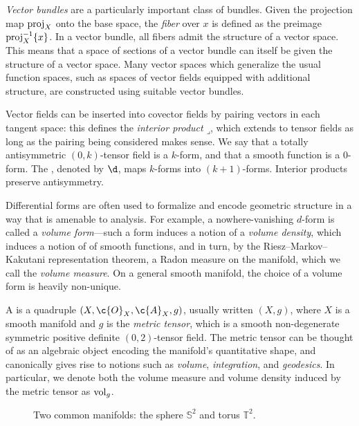 \documentclass[11pt]{book}
\begin{document}
\emph{Vector bundles} are a particularly important class of bundles.
Given the projection map $\operatorname{proj}_X$ onto the base space, the \emph{fiber} over $x$ is defined as the preimage $\operatorname{proj}_X^{-1} \{x\}$.
In a vector bundle, all fibers admit the structure of a vector space.
This means that a space of sections of a vector bundle can itself be given the structure of a vector space. 
Many vector spaces which generalize the usual function spaces, such as spaces of vector fields equipped with additional structure, are constructed using suitable vector bundles.

Vector fields can be inserted into covector fields by pairing vectors in each tangent space: this defines the \emph{interior product} $\mathbin{\lrcorner}$, which extends to tensor fields as long as the pairing being considered makes sense.
We say that a totally antisymmetric $(0,k)$-tensor field is a $k$-form, and that a smooth function is a $0$-form.
The , denoted by $\d$, maps $k$-forms into $(k+1)$-forms.
Interior products preserve antisymmetry.

Differential forms are often used to formalize and encode geometric structure in a way that is amenable to analysis.
For example, a nowhere-vanishing $d$-form is called a \emph{volume form}---such a form induces a notion of a \emph{volume density}, which induces a notion of  of smooth functions, and in turn, by the Riesz--Markov--Kakutani representation theorem, a Radon measure on the manifold, which we call the \emph{volume measure}.
On a general smooth manifold, the choice of a volume form is heavily non-unique.

\label{ntn:metric-tensor}
A  is a quadruple $(X,\c{O}_X,\c{A}_X,g)$, usually written $(X,g)$, where $X$ is a smooth manifold and $g$ is the \emph{metric tensor}, which is a smooth non-degenerate symmetric positive definite $(0,2)$-tensor field.
The metric tensor can be thought of as an algebraic object encoding the manifold's quantitative shape, and canonically gives rise to notions such as \emph{volume}, \emph{integration}, and \emph{geodesics}.
In particular, we denote both the volume measure and volume density induced by the metric tensor as $\operatorname{vol}_g$.

\begin{figure}
\tikzset{external/export next=false}
\caption[Common manifolds]{Two common manifolds: the sphere $\mathbb{S}^2$ and torus $\mathbb{T}^2$.}
\label{fig:common-manifolds}
\end{figure}
\end{document}

